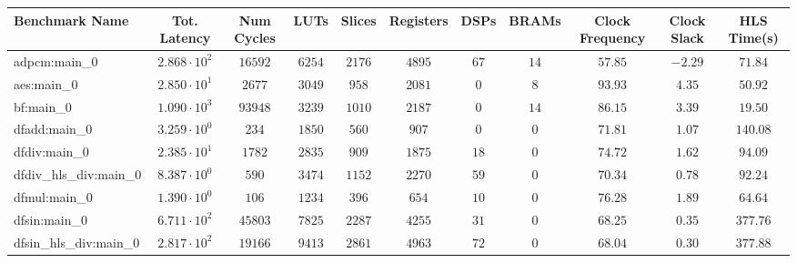 \begin{tabular}{|l|c|c|c|c|c|c|c|c|c|c|}
\hline
Benchmark Name          & Tot. Latency           & Num Cycles & LUTs      & Slices    & Registers & DSPs    & BRAMs   & Clock Frequency & Clock Slack & HLS Time(s) \\
\hline
adpcm:main\_0           & $ 2.868 \cdot 10^{2} $ & $ 16592  $ & $ 6254  $ & $ 2176  $ & $ 4895  $ & $ 67  $ & $ 14  $ & $ 57.85       $ & $ -2.29   $ & $ 71.84   $ \\
aes:main\_0             & $ 2.850 \cdot 10^{1} $ & $ 2677   $ & $ 3049  $ & $ 958   $ & $ 2081  $ & $ 0   $ & $ 8   $ & $ 93.93       $ & $ 4.35    $ & $ 50.92   $ \\
bf:main\_0              & $ 1.090 \cdot 10^{3} $ & $ 93948  $ & $ 3239  $ & $ 1010  $ & $ 2187  $ & $ 0   $ & $ 14  $ & $ 86.15       $ & $ 3.39    $ & $ 19.50   $ \\
dfadd:main\_0           & $ 3.259 \cdot 10^{0} $ & $ 234    $ & $ 1850  $ & $ 560   $ & $ 907   $ & $ 0   $ & $ 0   $ & $ 71.81       $ & $ 1.07    $ & $ 140.08  $ \\
dfdiv:main\_0           & $ 2.385 \cdot 10^{1} $ & $ 1782   $ & $ 2835  $ & $ 909   $ & $ 1875  $ & $ 18  $ & $ 0   $ & $ 74.72       $ & $ 1.62    $ & $ 94.09   $ \\
dfdiv\_hls\_div:main\_0 & $ 8.387 \cdot 10^{0} $ & $ 590    $ & $ 3474  $ & $ 1152  $ & $ 2270  $ & $ 59  $ & $ 0   $ & $ 70.34       $ & $ 0.78    $ & $ 92.24   $ \\
dfmul:main\_0           & $ 1.390 \cdot 10^{0} $ & $ 106    $ & $ 1234  $ & $ 396   $ & $ 654   $ & $ 10  $ & $ 0   $ & $ 76.28       $ & $ 1.89    $ & $ 64.64   $ \\
dfsin:main\_0           & $ 6.711 \cdot 10^{2} $ & $ 45803  $ & $ 7825  $ & $ 2287  $ & $ 4255  $ & $ 31  $ & $ 0   $ & $ 68.25       $ & $ 0.35    $ & $ 377.76  $ \\
dfsin\_hls\_div:main\_0 & $ 2.817 \cdot 10^{2} $ & $ 19166  $ & $ 9413  $ & $ 2861  $ & $ 4963  $ & $ 72  $ & $ 0   $ & $ 68.04       $ & $ 0.30    $ & $ 377.88  $ \\

\end{tabular}
